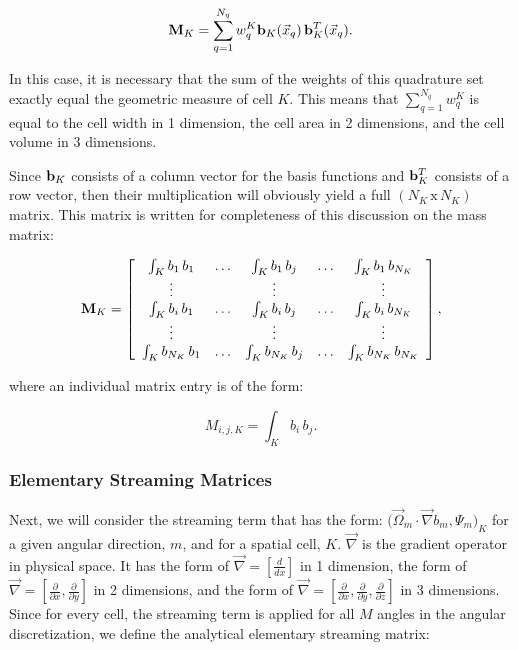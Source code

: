 \begin{equation}
\label{eq::Sn_mass_matrix_numerical}
{\bf M}_K = \sum_{q = 1}^{N_q} w_{q}^K {\bf b}_K (\vec{x}_q) \, {\bf b}_K^T (\vec{x}_q)  .
\end{equation}

\noindent In this case, it is necessary that the sum of the weights of this quadrature set exactly equal the geometric measure of cell $K$. This means that $\sum_{q = 1}^{N_q} w_{q}^K$ is equal to the cell width in 1 dimension, the cell area in 2 dimensions, and the cell volume in 3 dimensions.

Since ${\bf b}_K$ consists of a column vector for the basis functions and ${\bf b}_K^{T}$ consists of a row vector, then their multiplication will obviously yield a full $(N_K \, \text{x} \, N_K)$ matrix. This matrix is written for completeness of this discussion on the mass matrix:

\begin{equation}
\label{eq::Sn_mass_matrix_array}
{\bf M}_K =   \left[
\begin{array} {ccccc}
	\int_K b_1 \, b_1  & \ldots & \int_K b_1 \, b_j  & \ldots & \int_K b_1 \, b_{N_K} \\
	\vdots  &  & \vdots  &  & \vdots \\
	\int_K b_i \, b_1  & \ldots & \int_K b_i \, b_j  & \ldots & \int_K b_i \, b_{N_K} \\
	\vdots  &  & \vdots  &  & \vdots \\
	\int_K b_{N_K} \, b_1  & \ldots & \int_K b_{N_K} \, b_j  & \ldots & \int_K b_{N_K} \, b_{N_K} \\
\end{array}
\right] ,
\end{equation}

\noindent where an individual matrix entry is of the form:

\begin{equation}
\label{eq::Sn_mass_matrix_entry}
M_{i,j,K} =  \int_K b_i \, b_j .
\end{equation}

\subsubsection{Elementary Streaming Matrices}
\label{sec::Sn_Spatial_Matrices_Streaming}

Next, we will consider the streaming term that has the form: $ \Big( \vec{\Omega}_m \cdot \vec{\nabla}  b_m , \Psi_m  \Big)_K$ for a given angular direction, $m$, and for a spatial cell, $K$. $\vec{\nabla} $ is the gradient operator in physical space. It has the form of $\vec{\nabla} = \left[ \frac{d}{dx} \right]$ in 1 dimension, the form of $\vec{\nabla} = \left[ \frac{\partial}{\partial x} , \frac{\partial}{\partial y} \right]$ in 2 dimensions, and the form of $\vec{\nabla} = \left[ \frac{\partial}{\partial x} , \frac{\partial}{\partial y} , \frac{\partial}{\partial z} \right]$ in 3 dimensions. Since for every cell, the streaming term is applied for all $M$ angles in the angular discretization, we define the analytical elementary streaming matrix:

